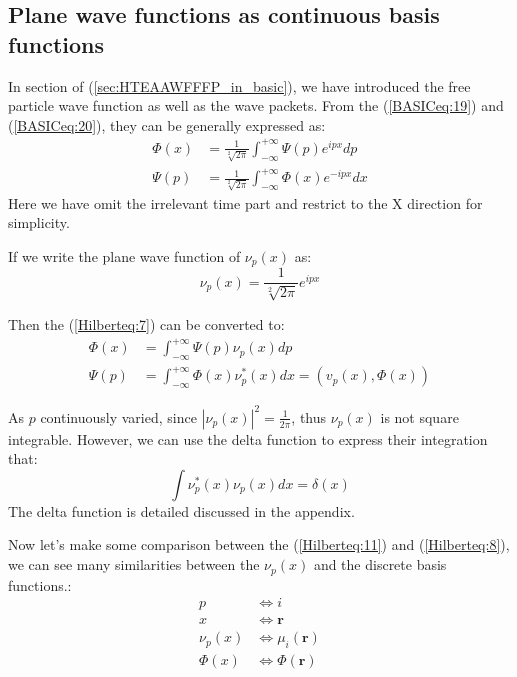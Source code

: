 
\subsection{Plane wave functions as continuous basis functions}
\label{sec:PWF_in_Hilbert}

In section of (\ref{sec:HTEAAWFFFP_in_basic}), we have introduced the
free particle wave function as well as the wave packets. From the
(\ref{BASICeq:19}) and (\ref{BASICeq:20}), they can be generally
expressed as:
\begin{align}
  \label{Hilberteq:7}
\Phi(x) &=
\frac{1}{\sqrt[2]{2\pi}}\int_{-\infty}^{+\infty}\Psi(p)e^{ipx}dp
\nonumber \\
\Psi(p) &=
\frac{1}{\sqrt[2]{2\pi}}\int_{-\infty}^{+\infty}\Phi(x)e^{-ipx}dx
\end{align}
Here we have omit the irrelevant time part and restrict to the X
direction for simplicity.

If we write the plane wave function of $\nu_{p}(x)$ as:
\begin{equation}
  \label{Hilberteq:8}
  \nu_{p}(x) = \frac{1}{\sqrt[2]{2\pi}}e^{ipx}
\end{equation}

Then the (\ref{Hilberteq:7}) can be converted to:
\begin{align}
  \label{Hilberteq:9}
\Phi(x) &= \int_{-\infty}^{+\infty}\Psi(p)\nu_{p}(x)dp
\nonumber \\
\Psi(p) &= \int_{-\infty}^{+\infty}\Phi(x)\nu_{p}^{*}(x)dx = (v_{p}(x), \Phi(x))
\end{align}

As $p$ continuously varied, since $|\nu_{p}(x)|^{2} = \frac{1}{2\pi}$,
thus $\nu_{p}(x)$ is not square integrable. However, we can use the
delta function to express their integration that:
\begin{equation}
  \label{Hilberteq:16}
  \int \nu_{p}^{*}(x)\nu_{p}(x) dx = \delta(x)
\end{equation}
The delta function is detailed discussed in the appendix.

Now let's make some comparison between the (\ref{Hilberteq:11}) and
(\ref{Hilberteq:8}), we can see many similarities between the
$\nu_{p}(x)$ and the discrete basis functions.:
\begin{align}
  \label{Hilberteq:10}
p &\Leftrightarrow i \nonumber \\
x &\Leftrightarrow \bm{r} \nonumber \\
\nu_{p}(x) &\Leftrightarrow \mu_{i}(\bm{r}) \nonumber \\
\Phi(x) &\Leftrightarrow \Phi(\bm{r})
\end{align}

